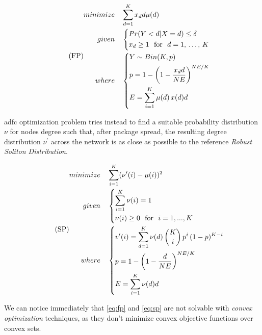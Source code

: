 \documentclass[12pt,journal,draftclsnofoot,onecolumn]{IEEEtran}
\begin{document}
\begin{equation}
	\label{eq:fp}
	\tag{FP}
	\begin{split}
		minimize \quad & \sum_{d=1}^K x_d d \mu (d) \\
		given \quad & \begin{dcases}
			Pr(Y<d|X=d) \leq \delta \\
			x_d \geq 1 \text{ ~for~ } d = 1, \, \ldots, \, K
		\end{dcases} \\
		where \quad & \begin{dcases}
			Y \sim Bin(K, p) \\
			p = 1 - \left( 1 - \frac{x_d d}{NE} \right) ^ {NE / K} \\
			E = \sum_{i = 1}^{K} \mu(d) \, x(d) d
		\end{dcases} \\
	\end{split}
\end{equation}

\bigbreak

\gls{adfc} optimization problem tries instead to find a suitable probability distribution $\nu$ for nodes degree such that, after package spread, the resulting degree distribution $\nu^\prime$ across the network is as close as possible to the reference \emph{Robust Soliton Distribution}.

\begin{equation}
	\label{eq:sp}
	\tag{SP}
	\begin{split}
		minimize & \quad \sum_{i=1}^{K}(\nu'(i)-\mu(i))^2 \\
		given & \quad \begin{dcases}
			\sum_{i=1}^K \nu(i) = 1 \\
			\nu(i) \geq 0 \text{~~for~~} i=1,...,K
		\end{dcases} \\
		where & \quad
		\begin{dcases}
			v^\prime(i) = \sum_{d=1}^K \nu(d) \,\binom{K}{i} \, p^i \, (1-p)^{K-i} \\
			p = 1 - \left(1 -\frac{d}{N E}\right)^{{N E} / {K}} \\
			E = \sum_{i = 1}^{K} \nu(d) d
		\end{dcases}
	\end{split}
\end{equation}

\bigbreak

We can notice immediately that \autoref{eq:fp} and \autoref{eq:sp} are not solvable with \emph{convex optimization} techniques, as they don't minimize convex objective functions over convex sets.
\end{document}
